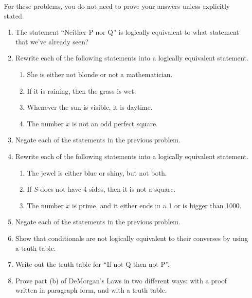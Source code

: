 \probsec{~\ref{sec:negat-logic-equiv}}

\noindent For these problems, you do not need to prove your answers unless explicitly stated.

\begin{enumerate}
    \item The statement ``Neither P nor Q'' is logically equivalent to what statement that we've already seen?

    \item Rewrite each of the following statements into a logically equivalent statement.
  \begin{enumerate}
      \item She is either not blonde or not a mathematician.
      \item If it is raining, then the grass is wet.
      \item Whenever the sun is visible, it is daytime.
      \item The number $x$ is not an odd perfect square.
  \end{enumerate}

    \item Negate each of the statements in the previous problem.

    \item Rewrite each of the following statements into a logically equivalent statement.
  \begin{enumerate}
      \item The jewel is either blue or shiny, but not both.
      \item If $S$ does not have 4 sides, then it is not a square.
      \item The number $x$ is prime, and it either ends in a 1 or is
    bigger than 1000.
  \end{enumerate}

    \item Negate each of the statements in the previous problem.

    \item Show that conditionals are not logically equivalent to their converses by using a truth table.

    \item Write out the truth table for ``If not Q then not P''.

    \item Prove part (b) of DeMorgan's Laws in two different ways: with a proof written in paragraph form, and with a truth table.


\end{enumerate}
